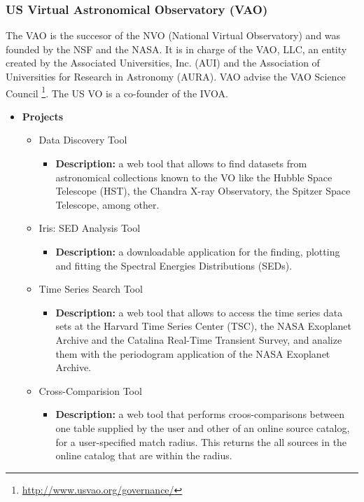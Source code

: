 \subsubsection{US Virtual Astronomical Observatory (VAO)}
The VAO \cite{website:vao-home}is the succesor of the NVO (National Virtual
Observatory) and was founded by the NSF and the NASA. It is in charge of the
VAO, LLC, an entity created by the Associated Universities, Inc. (AUI) and the
Association of Universities for Research in Astronomy (AURA). VAO advise the VAO
Science Council \footnote{\url{http://www.usvao.org/governance/}}. The US VO is
a co-founder of the IVOA.

\begin{itemize}
\item \textbf{Projects}
\begin{itemize}
\item Data Discovery Tool
\begin{itemize}
\item \textbf{Description:} a web tool that allows to find datasets from
astronomical collections known to the VO like the Hubble Space Telescope (HST),
the Chandra X-ray Observatory, the Spitzer Space Telescope, among other.
\end{itemize}
\item Iris: SED Analysis Tool
\begin{itemize}
\item \textbf{Description:} a downloadable application for the finding, plotting
and fitting the Spectral Energies Distributions (SEDs). 
\end{itemize}
\item Time Series Search Tool
\begin{itemize}
\item \textbf{Description:} a web tool that allows to access the time series
data sets at the Harvard Time Series Center (TSC), the NASA Exoplanet Archive
and the Catalina Real-Time Transient Survey, and analize them with the
periodogram application of the NASA Exoplanet Archive.
\end{itemize}
\item Cross-Comparision Tool
\begin{itemize}
\item \textbf{Description:} a web tool that performs croos-comparisons between
one table supplied by the user and other of an online source catalog, for a
user-specified match radius. This returns the all sources in the online catalog
that are within the radius.
\end{itemize}
\end{itemize}
\end{itemize}

